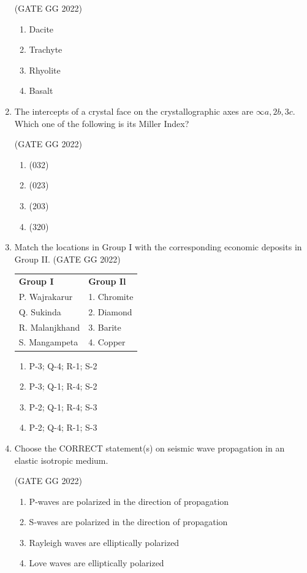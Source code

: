 \documentclass[journal]{IEEEtran}
\begin{document}
\begin{enumerate}
\hfill(GATE GG 2022)
\begin{enumerate}
\item Dacite
\item Trachyte
\item Rhyolite
\item Basalt
\end{enumerate}

\item The intercepts of a crystal face on the crystallographic axes are $\infty a, 2b, 3c$.  
Which one of the following is its Miller Index?

\hfill(GATE GG 2022)
\begin{enumerate}
\item (032)
\item (023)
\item (203)
\item (320)
\end{enumerate}

\item Match the locations in Group I with the corresponding economic deposits in Group II.
\hfill(GATE GG 2022)
\begin{tabular}{ l l }
\textbf{Group I} & \textbf{Group Il}\\
P. Wajrakarur & 1. Chromite \\
 Q. Sukinda & 2. Diamond\\
 R. Malanjkhand &  3. Barite\\
 S. Mangampeta & 4. Copper
\end{tabular}
\begin{enumerate}
\item P-3; Q-4; R-1; S-2
\item P-3; Q-1; R-4; S-2
\item P-2; Q-1; R-4; S-3
\item P-2; Q-4; R-1; S-3
\end{enumerate}

\item Choose the CORRECT statement(s) on seismic wave propagation in an elastic isotropic medium.

\hfill(GATE GG 2022)
\begin{enumerate}
\item P-waves are polarized in the direction of propagation
\item S-waves are polarized in the direction of propagation
\item Rayleigh waves are elliptically polarized
\item Love waves are elliptically polarized
\end{enumerate}


\end{enumerate}
\end{document}
